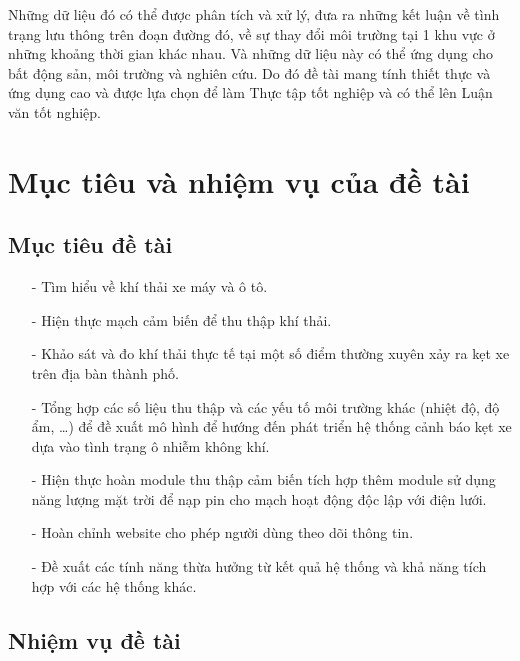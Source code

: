 Những dữ liệu đó có thể được phân tích và xử lý, đưa ra những kết luận về tình trạng lưu thông trên đoạn đường đó, về sự thay đổi môi trường tại 1 khu vực ở những khoảng thời gian khác nhau. Và những dữ liệu này có thể ứng dụng cho bất động sản, môi trường và nghiên cứu. Do đó đề tài mang tính thiết thực và ứng dụng cao và được lựa chọn để làm Thực tập tốt nghiệp và có thể lên Luận văn tốt nghiệp.




\section{Mục tiêu và nhiệm vụ của đề tài} %
\label{section1.2}
\subsection{Mục tiêu đề tài}
\begin{itemize}
\item[-]Tìm hiểu về khí thải xe máy và ô tô.

\item[-]Hiện thực mạch cảm biến để thu thập khí thải.

\item[-]Khảo sát và đo khí thải thực tế tại một số điểm thường xuyên xảy ra kẹt xe trên địa bàn thành phố.

\item[-]Tổng hợp các số liệu thu thập và các yếu tố môi trường khác (nhiệt độ, độ ẩm, …) để đề xuất mô hình để hướng đến phát triển hệ thống cảnh báo kẹt xe dựa vào tình trạng ô nhiễm không khí.

\item[-]Hiện thực hoàn module thu thập cảm biến tích hợp thêm module sử dụng năng lượng mặt trời để nạp pin cho mạch hoạt động độc lập với điện lưới.
\item[-]Hoàn chỉnh website cho phép người dùng theo dõi thông tin.
\item[-]Đề xuất các tính năng thừa hưởng từ kết quả hệ thống và khả năng tích hợp với các hệ thống khác.


\end{itemize}

\subsection{Nhiệm vụ đề tài}

